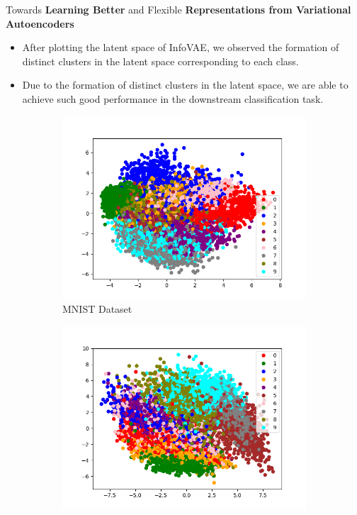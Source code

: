 \documentclass[hyperref={colorlinks,citecolor=blue,linkcolor=blue,urlcolor=blue}]{beamer}
\begin{document}
\begin{frame}{ Towards \textbf{Learning Better} and Flexible \textbf{Representations from Variational Autoencoders} \vspace{0.3em}}
  \begin{itemize}
    \item After plotting the latent space of InfoVAE, we observed the formation of distinct clusters in the latent space corresponding to each class.
    \item Due to the formation of distinct clusters in the latent space, we are able to achieve such good performance in the downstream classification task.
  \end{itemize}
  \begin{figure}
    \begin{subfigure}[b]{0.4\textwidth}
        \centering
        \includegraphics[width=\textwidth,]{./Images/latent_MNIST_MMD_Sampling.png}
        \caption{MNIST Dataset}
    \end{subfigure}
    \begin{subfigure}[b]{0.4\textwidth}
        \centering
        \includegraphics[width=\textwidth]{./Images/latent_FashionMNIST_MMD_Sampling.png}

\end{subfigure}
\end{figure}
\end{frame}
\end{document}
